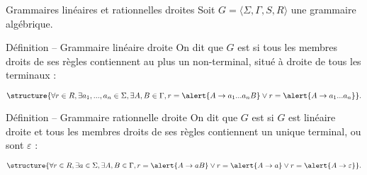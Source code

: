 
\begingroup

\begin{frame}{Grammaires linéaires et rationnelles droites}
  Soit \alert{$G = \langle \Sigma, \Gamma, S, R \rangle$} une grammaire algébrique. 

  \vspace{2mm}
  \begin{block}{Définition -- Grammaire linéaire droite}
    On dit que $G$ est  si tous les membres droits de ses règles
    contiennent au plus un non-terminal, situé à droite de tous les terminaux :

    {\small $$
      \structure{\forall r\in R, \exists a_1, ..., a_n \in \Sigma, \exists A, B \in \Gamma, r = \alert{A \rightarrow a_1 ... a_n B} \lor r = \alert{A \rightarrow a_1 ... a_n}}.
      $$}
  \end{block}
  
  \vspace{2mm}
  \begin{block}{Définition -- Grammaire rationnelle droite}
    On dit que $G$ est  si $G$ est linéaire droite et tous les membres droits de ses règles
    contiennent un unique terminal, ou sont $\varepsilon$ :

    {\small $$
      \structure{\forall r\in R, \exists a \in \Sigma, \exists A, B \in \Gamma, r = \alert{A \rightarrow a B} \lor r = \alert{A \rightarrow a} \lor r = \alert{A \rightarrow \varepsilon}}.
      $$}
  \end{block}
\end{frame}

\endgroup
